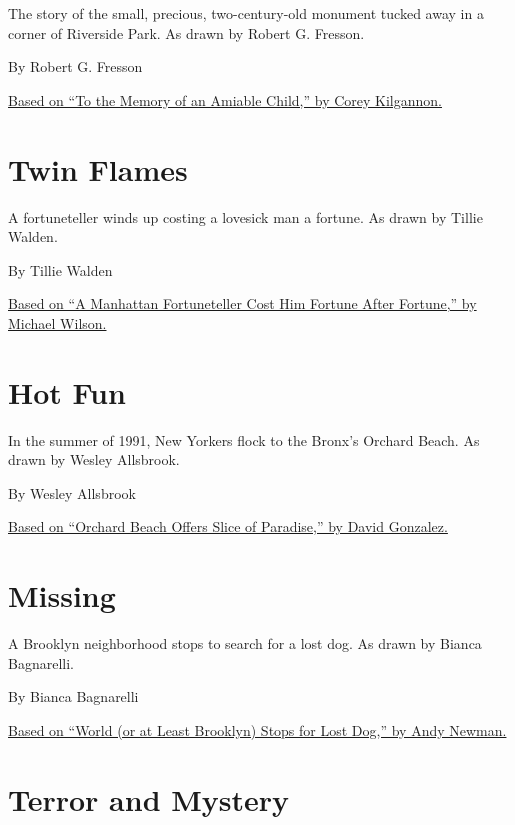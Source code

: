 The story of the small, precious, two-century-old monument tucked away
in a corner of Riverside Park. As drawn by Robert G. Fresson.

By Robert G. Fresson

\href{https://cityroom.blogs.nytimes3xbfgragh.onion/2008/08/12/to-the-memory-of-an-amiable-child/comment-page-1/}{Based
on ``To the Memory of an Amiable Child,'' by Corey Kilgannon.}

\hypertarget{twin-flames}{%
\section{Twin Flames}\label{twin-flames}}

A fortuneteller winds up costing a lovesick man a fortune. As drawn by
Tillie Walden.

By Tillie Walden

\href{https://www.nytimes3xbfgragh.onion/2015/06/06/nyregion/he-went-to-the-fortuneteller-now-his-fortune-is-gone.html}{Based
on ``A Manhattan Fortuneteller Cost Him Fortune After Fortune,'' by
Michael Wilson.}

\hypertarget{hot-fun}{%
\section{Hot Fun}\label{hot-fun}}

In the summer of 1991, New Yorkers flock to the Bronx's Orchard Beach.
As drawn by Wesley Allsbrook.

By Wesley Allsbrook

\href{http://www.nytimes3xbfgragh.onion/1991/07/01/nyregion/orchard-beach-offers-slice-of-paradise.html}{Based
on ``Orchard Beach Offers Slice of Paradise,'' by David Gonzalez.}

\hypertarget{missing}{%
\section{Missing}\label{missing}}

A Brooklyn neighborhood stops to search for a lost dog. As drawn by
Bianca Bagnarelli.

By Bianca Bagnarelli

\href{https://www.nytimes3xbfgragh.onion/2016/11/13/nyregion/world-or-at-least-brooklyn-stops-for-lost-dog.html}{Based
on ``World (or at Least Brooklyn) Stops for Lost Dog,'' by Andy Newman.}

\hypertarget{terror-and-mystery}{%
\section{Terror and Mystery}\label{terror-and-mystery}}

